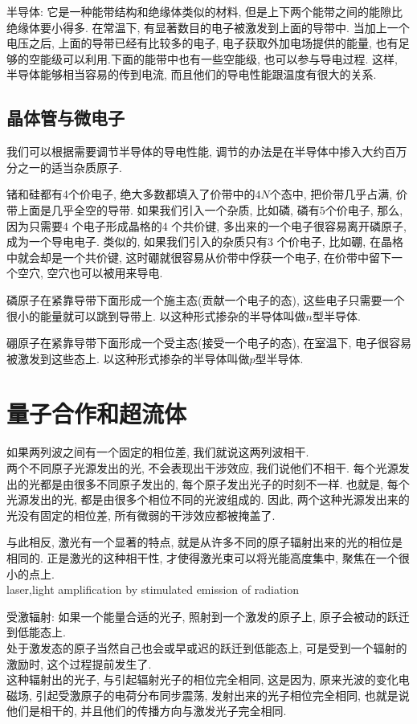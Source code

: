 半导体: 它是一种能带结构和绝缘体类似的材料, 但是上下两个能带之间的能隙比绝缘体要小得多. 在常温下, 有显著数目的电子被激发到上面的导带中.
当加上一个电压之后, 上面的导带已经有比较多的电子, 电子获取外加电场提供的能量, 也有足够的空能级可以利用.下面的能带中也有一些空能级, 也可以参与导电过程.
这样, 半导体能够相当容易的传到电流, 而且他们的导电性能跟温度有很大的关系.

\subsection{晶体管与微电子}
我们可以根据需要调节半导体的导电性能, 调节的办法是在半导体中掺入大约百万分之一的适当杂质原子.

锗和硅都有4个价电子, 绝大多数都填入了价带中的$4N$个态中, 把价带几乎占满, 价带上面是几乎全空的导带.
如果我们引入一个杂质, 比如磷, 磷有$5$个价电子, 那么, 因为只需要4 个电子形成晶格的4 个共价键, 多出来的一个电子很容易离开磷原子, 成为一个导电电子.
类似的, 如果我们引入的杂质只有3 个价电子, 比如硼, 在晶格中就会却是一个共价键, 这时硼就很容易从价带中俘获一个电子, 在价带中留下一个空穴, 空穴也可以被用来导电.

磷原子在紧靠导带下面形成一个施主态(贡献一个电子的态), 这些电子只需要一个很小的能量就可以跳到导带上. 以这种形式掺杂的半导体叫做$n$型半导体.\par
硼原子在紧靠导带下面形成一个受主态(接受一个电子的态), 在室温下, 电子很容易被激发到这些态上. 以这种形式掺杂的半导体叫做$p$型半导体.

\section{量子合作和超流体}
如果两列波之间有一个固定的相位差, 我们就说这两列波相干.\\
两个不同原子光源发出的光, 不会表现出干涉效应, 我们说他们不相干. 每个光源发出的光都是由很多不同原子发出的, 每个原子发出光子的时刻不一样.
也就是, 每个光源发出的光, 都是由很多个相位不同的光波组成的. 因此, 两个这种光源发出来的光没有固定的相位差, 所有微弱的干涉效应都被掩盖了.

与此相反, 激光有一个显著的特点, 就是从许多不同的原子辐射出来的光的相位是相同的. 正是激光的这种相干性, 才使得激光束可以将光能高度集中, 聚焦在一个很小的点上.\\
laser,light amplification by stimulated emission of radiation

受激辐射: 如果一个能量合适的光子, 照射到一个激发的原子上, 原子会被动的跃迁到低能态上.\\
处于激发态的原子当然自己也会或早或迟的跃迁到低能态上, 可是受到一个辐射的激励时, 这个过程提前发生了.\\
这种辐射出的光子, 与引起辐射光子的相位完全相同,
这是因为, 原来光波的变化电磁场, 引起受激原子的电荷分布同步震荡, 发射出来的光子相位完全相同, 也就是说他们是相干的, 并且他们的传播方向与激发光子完全相同.

